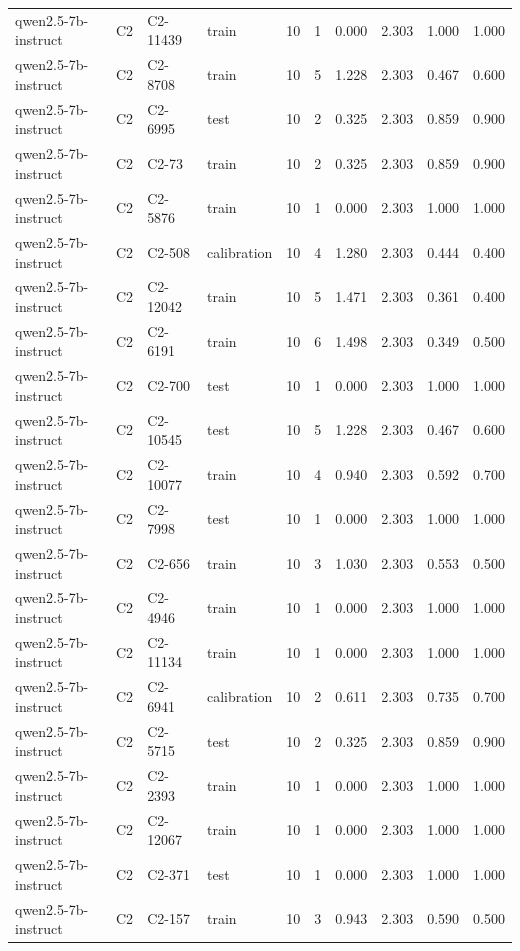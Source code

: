 \begin{table}
\begin{tabular}{llllrrrrrr}
qwen2.5-7b-instruct & C2 & C2-11439 & train & 10 & 1 & 0.000 & 2.303 & 1.000 & 1.000 \\
qwen2.5-7b-instruct & C2 & C2-8708 & train & 10 & 5 & 1.228 & 2.303 & 0.467 & 0.600 \\
qwen2.5-7b-instruct & C2 & C2-6995 & test & 10 & 2 & 0.325 & 2.303 & 0.859 & 0.900 \\
qwen2.5-7b-instruct & C2 & C2-73 & train & 10 & 2 & 0.325 & 2.303 & 0.859 & 0.900 \\
qwen2.5-7b-instruct & C2 & C2-5876 & train & 10 & 1 & 0.000 & 2.303 & 1.000 & 1.000 \\
qwen2.5-7b-instruct & C2 & C2-508 & calibration & 10 & 4 & 1.280 & 2.303 & 0.444 & 0.400 \\
qwen2.5-7b-instruct & C2 & C2-12042 & train & 10 & 5 & 1.471 & 2.303 & 0.361 & 0.400 \\
qwen2.5-7b-instruct & C2 & C2-6191 & train & 10 & 6 & 1.498 & 2.303 & 0.349 & 0.500 \\
qwen2.5-7b-instruct & C2 & C2-700 & test & 10 & 1 & 0.000 & 2.303 & 1.000 & 1.000 \\
qwen2.5-7b-instruct & C2 & C2-10545 & test & 10 & 5 & 1.228 & 2.303 & 0.467 & 0.600 \\
qwen2.5-7b-instruct & C2 & C2-10077 & train & 10 & 4 & 0.940 & 2.303 & 0.592 & 0.700 \\
qwen2.5-7b-instruct & C2 & C2-7998 & test & 10 & 1 & 0.000 & 2.303 & 1.000 & 1.000 \\
qwen2.5-7b-instruct & C2 & C2-656 & train & 10 & 3 & 1.030 & 2.303 & 0.553 & 0.500 \\
qwen2.5-7b-instruct & C2 & C2-4946 & train & 10 & 1 & 0.000 & 2.303 & 1.000 & 1.000 \\
qwen2.5-7b-instruct & C2 & C2-11134 & train & 10 & 1 & 0.000 & 2.303 & 1.000 & 1.000 \\
qwen2.5-7b-instruct & C2 & C2-6941 & calibration & 10 & 2 & 0.611 & 2.303 & 0.735 & 0.700 \\
qwen2.5-7b-instruct & C2 & C2-5715 & test & 10 & 2 & 0.325 & 2.303 & 0.859 & 0.900 \\
qwen2.5-7b-instruct & C2 & C2-2393 & train & 10 & 1 & 0.000 & 2.303 & 1.000 & 1.000 \\
qwen2.5-7b-instruct & C2 & C2-12067 & train & 10 & 1 & 0.000 & 2.303 & 1.000 & 1.000 \\
qwen2.5-7b-instruct & C2 & C2-371 & test & 10 & 1 & 0.000 & 2.303 & 1.000 & 1.000 \\
qwen2.5-7b-instruct & C2 & C2-157 & train & 10 & 3 & 0.943 & 2.303 & 0.590 & 0.500 \\

\end{tabular}
\end{table}
